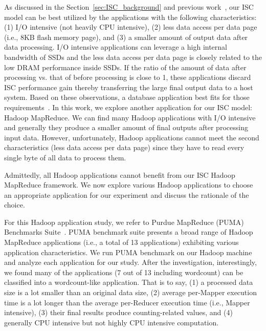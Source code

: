 As discussed in the Section~\ref{sec:ISC_background} and previous work~\cite{SmartSSD:SIGMOD:2013,SmartSSDHadoop:MSST:2013}, our ISC model can be best utilized by the applications with the following characteristics: (1) I/O intensive (not heavily CPU intensive), (2) less data access per data page (i.e., 8KB flash memory page), and (3) a smaller amount of output data after data processing. I/O intensive applications can leverage a high internal bandwidth of SSDs and the less data access per data page is closely related to the low DRAM performance inside SSDs. If the ratio of the amount of data after processing vs. that of before processing is close to 1, these applications discard ISC performance gain thereby transferring the large final output data to a host system. Based on these observations, a database application best fits for those requirements~\cite{SmartSSD:SIGMOD:2013}. In this work, we explore another application for our ISC model: Hadoop MapReduce. We can find many Hadoop applications with I/O intensive and generally they produce a smaller amount of final outputs after processing input data. 
However, unfortunately, Hadoop applications cannot meet the second characteristics (less data access per data page) since they have to read every single byte of all data to process them.

Admittedly, all Hadoop applications cannot benefit from our ISC Hadoop MapReduce framework. We now explore various Hadoop applications to choose an appropriate application for our experiment and discuss the rationale of the choice. 

For this Hadoop application study, we refer to Purdue MapReduce (PUMA) Benchmarks Suite~\cite{PUMA:Purdue:2012}. PUMA benchmark suite presents a broad range of Hadoop MapReduce applications (i.e., a total of 13 applications) exhibiting various application characteristics. We run PUMA benchmark on our Hadoop machine and analyze each application for our study. After the investigation, interestingly, we found many of the applications (7 out of 13 including wordcount) can be classified into a wordcount-like application. That is to say, (1) a processed data size is a lot smaller than an original data size, (2) average per-Mapper execution time is a lot longer than the average per-Reducer execution time (i.e., Mapper intensive), (3) their final results produce counting-related values, and (4) generally CPU intensive but not highly CPU intensive computation.

